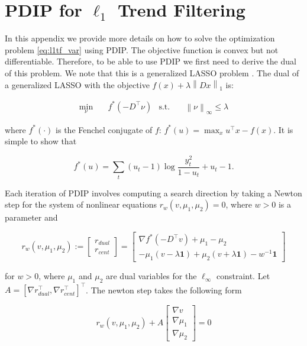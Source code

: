 \documentclass[letterpaper]{article} %
\newcommand{\citep}{\cite}
\newcommand{\one}{\mathbf{1}}
\newcommand{\norm}[1]{\left\lVert #1 \right\rVert}
\begin{document}
\fontsize{9.0pt}{10.0pt} \selectfont


\clearpage

\appendix
\section{PDIP for $\ell_1$ Trend Filtering}
\label{sec:app_l1tf_var}

In this appendix we provide more details on how to solve the optimization problem \ref{eq:l1tf_var} using PDIP. The objective function is convex but not differentiable. Therefore, to be able to use PDIP we first need to derive the dual of this problem. We note that this is a generalized LASSO problem \citep{TibshiraniTaylor2011}. The dual of a generalized LASSO with the objective $f(x)+\lambda \norm{ Dx }_1$ is:  

\begin{align}
\min_\nu&\quad f^*(-D^\top\nu) & \mbox{s.t.}&\quad \norm{ \nu }_\infty \le \lambda
\end{align}

where $f^*(\cdot)$ is the Fenchel conjugate of $f$: $f^*(u)=\max_x u^\top x-f(x)$. It is simple to show that 

\begin{equation}
f^*(u)=\sum_t (u_t-1)\log\frac{y_t^2}{1-u_t} + u_t-1.
\label{eq:conj}
\end{equation}

Each iteration of PDIP involves computing a search direction by taking a Newton step for the system of nonlinear equations $r_w(v,\mu_1,\mu_2)=0$, where $w>0$ is a parameter and

\begin{equation}
  r_w(v,\mu_1,\mu_2):=
	\begin{bmatrix}
	r_{dual}\\
	r_{cent}	
	\end{bmatrix}=
  \begin{bmatrix}
    \nabla f^*(-D^\top v) + \mu_1 - \mu_2\\
    -\mu_1(v-\lambda\one)+\mu_2(v + \lambda\one) -w^{-1}\one
  \end{bmatrix}
\label{eq:resid}
\end{equation}

for $w>0$, where $\mu_1$ and $\mu_2$ are dual variables for the $\ell_\infty$ constraint. Let $A=[\nabla r_{dual}^\top , \nabla r_{cent}^\top]^\top$. The newton step takes the following form

\begin{equation}
r_w(v,\mu_1,\mu_2)+A
\begin{bmatrix}
	\nabla v\\
	\nabla \mu_1\\
	\nabla \mu_2	
	\end{bmatrix}= 0
\label{eq:newton_step}
\end{equation}
\end{document}
